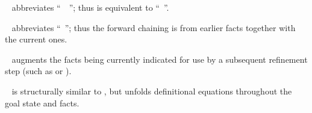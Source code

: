 \begin{isabellebody}
\begin{isamarkuptext}
\begin{description}
  \item \hyperlink{command.from}{\mbox{}}~ abbreviates ``\hyperlink{command.note}{\mbox{}}~~\hyperlink{command.then}{\mbox{}}''; thus \hyperlink{command.then}{\mbox{}} is
  equivalent to ``\hyperlink{command.from}{\mbox{}}~''.
  
  \item \hyperlink{command.with}{\mbox{}}~ abbreviates ``\hyperlink{command.from}{\mbox{}}~''; thus the forward chaining
  is from earlier facts together with the current ones.
  
  \item \hyperlink{command.using}{\mbox{}}~ augments the facts being
  currently indicated for use by a subsequent refinement step (such as
  \hyperlink{command.apply}{\mbox{}} or \hyperlink{command.proof}{\mbox{}}).
  
  \item \hyperlink{command.unfolding}{\mbox{}}~ is structurally
  similar to \hyperlink{command.using}{\mbox{}}, but unfolds definitional equations
   throughout the goal state and facts.


\end{description}
\end{isamarkuptext}
\end{isabellebody}
